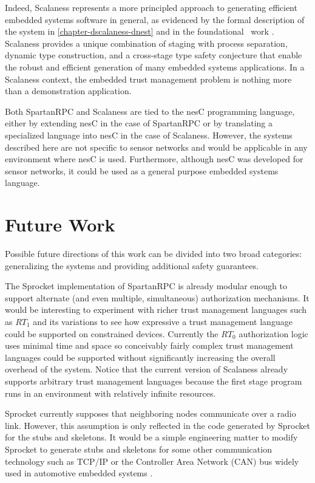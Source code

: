 Indeed, Scalaness represents a more principled approach to generating efficient embedded systems
software in general, as evidenced by the formal description of the system in
\autoref{chapter-dscalaness-dnest} and in the foundational \fml\ work \cite{FramedML}. Scalaness
provides a unique combination of staging with process separation, dynamic type construction, and
a cross-stage type safety conjecture that enable the robust and efficient generation of many
embedded systems applications. In a Scalaness context, the embedded trust management problem is
nothing more than a demonstration application.

Both SpartanRPC and Scalaness are tied to the nesC programming language, either by extending
nesC in the case of SpartanRPC or by translating a specialized language into nesC in the case of
Scalaness. However, the systems described here are not specific to sensor networks and would be
applicable in any environment where nesC is used. Furthermore, although nesC was developed for
sensor networks, it could be used as a general purpose embedded systems language.

\section{Future Work}
\label{section-future-work}

Possible future directions of this work can be divided into two broad categories: generalizing
the systems and providing additional safety guarantees.

The Sprocket implementation of SpartanRPC is already modular enough to support alternate (and
even multiple, simultaneous) authorization mechanisms. It would be interesting to experiment
with richer trust management languages such as $RT_1$ and its variations to see how expressive a
trust management language could be supported on constrained devices. Currently the $RT_0$
authorization logic uses minimal time and space so conceivably fairly complex trust management
languages could be supported without significantly increasing the overall overhead of the
system. Notice that the current version of Scalaness already supports arbitrary trust management
languages because the first stage program runs in an environment with relatively infinite
resources.

Sprocket currently supposes that neighboring nodes communicate over a radio link. However, this
assumption is only reflected in the code generated by Sprocket for the stubs and skeletons. It
would be a simple engineering matter to modify Sprocket to generate stubs and skeletons for some
other communication technology such as TCP/IP or the Controller Area Network (CAN) bus widely
used in automotive embedded systems \cite{pazul1999controller}.

